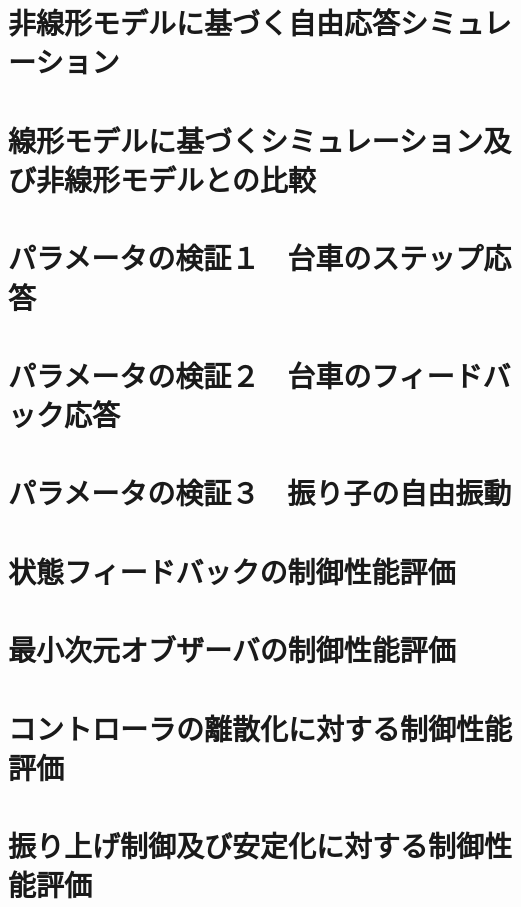 \section{非線形モデルに基づく自由応答シミュレーション}
\section{線形モデルに基づくシミュレーション及び非線形モデルとの比較}
\section{パラメータの検証１　台車のステップ応答}
\section{パラメータの検証２　台車のフィードバック応答}
\section{パラメータの検証３　振り子の自由振動}
\section{状態フィードバックの制御性能評価}
\section{最小次元オブザーバの制御性能評価}
\section{コントローラの離散化に対する制御性能評価}
\section{振り上げ制御及び安定化に対する制御性能評価}
